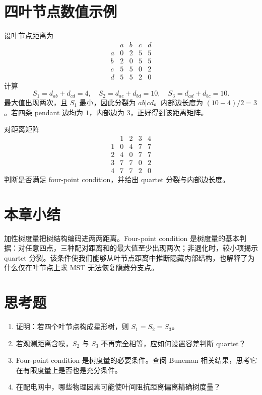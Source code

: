 \section{四叶节点数值示例}

\begin{example}[判断 quartet]
设叶节点距离为
\[
\begin{array}{c|cccc}
 & a&b&c&d\\ \hline
a&0&2&5&5\\
b&2&0&5&5\\
c&5&5&0&2\\
d&5&5&2&0
\end{array}
\]
计算
\[
S_1=d_{ab}+d_{cd}=4,\quad
S_2=d_{ac}+d_{bd}=10,\quad
S_3=d_{ad}+d_{bc}=10.
\]
最大值出现两次，且 $S_1$ 最小，因此分裂为 $ab|cd$。内部边长度为 $(10-4)/2=3$。若四条 pendant 边均为 $1$，内部边为 $3$，正好得到该距离矩阵。
\end{example}

\begin{exercise}
对距离矩阵
\[
\begin{array}{c|cccc}
 &1&2&3&4\\ \hline
1&0&4&7&7\\
2&4&0&7&7\\
3&7&7&0&2\\
4&7&7&2&0
\end{array}
\]
判断是否满足 four-point condition，并给出 quartet 分裂与内部边长度。
\end{exercise}

\section{本章小结}

加性树度量把树结构编码进两两距离。Four-point condition 是树度量的基本判据：对任意四点，三种配对距离和的最大值至少出现两次；非退化时，较小项揭示 quartet 分裂。该条件使我们能够从叶节点距离中推断隐藏内部结构，也解释了为什么仅在叶节点上求 MST 无法恢复隐藏分支点。

\section*{思考题}
\begin{enumerate}
  \item 证明：若四个叶节点构成星形树，则 $S_1=S_2=S_3$。
  \item 若观测距离含噪，$S_2$ 与 $S_3$ 不再完全相等，应如何设置容差判断 quartet？
  \item Four-point condition 是树度量的必要条件。查阅 Buneman 相关结果，思考它在有限度量上是否也是充分条件。
  \item 在配电网中，哪些物理因素可能使叶间阻抗距离偏离精确树度量？
\end{enumerate}
